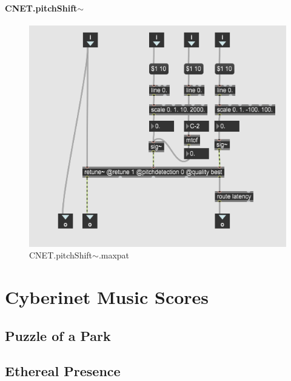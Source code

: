 \subsubsection{CNET.pitchShift$\sim$}

\begin{figure}
    \centering
    \includegraphics{diagrams/maxPatches/CNET.pitchShift~.png}
    \caption{CNET.pitchShift$\sim$.maxpat}
    \label{fig:pitchshift}
\end{figure}

\chapter{Cyberinet Music Scores}
\section{Puzzle of a Park}


\section{Ethereal Presence}




